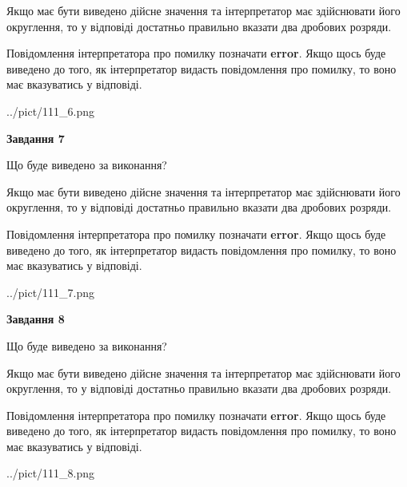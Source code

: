 \documentclass[12pt, ukrainian]{article}
\begin{document}
{\begin {Large}
Якщо має бути виведено дійсне значення та інтерпретатор має здійснювати його округлення, 
то у відповіді достатньо правильно вказати два дробових розряди.

Повідомлення інтерпретатора про помилку позначати \textbf{error}.
Якщо щось буде виведено до того, як інтерпретатор видасть повідомлення про помилку, 
то воно має вказуватись у відповіді. \par

\begin{center}
	{../pict/111_6.png}
\end{center}
\newpage

{\begin {center}\textbf{Завдання 7}\end {center}}\par
Що буде виведено за виконання? \par

Якщо має бути виведено дійсне значення та інтерпретатор має здійснювати його округлення, 
то у відповіді достатньо правильно вказати два дробових розряди.

Повідомлення інтерпретатора про помилку позначати \textbf{error}.
Якщо щось буде виведено до того, як інтерпретатор видасть повідомлення про помилку, 
то воно має вказуватись у відповіді. \par

\begin{center}
	{../pict/111_7.png}
\end{center}
\newpage

{\begin {center}\textbf{Завдання 8}\end {center}}\par
Що буде виведено за виконання? \par

Якщо має бути виведено дійсне значення та інтерпретатор має здійснювати його округлення, 
то у відповіді достатньо правильно вказати два дробових розряди.

Повідомлення інтерпретатора про помилку позначати \textbf{error}.
Якщо щось буде виведено до того, як інтерпретатор видасть повідомлення про помилку, 
то воно має вказуватись у відповіді. \par

\begin{center}
	{../pict/111_8.png}
\end{center}
\newpage


\end{Large}}
\end{document}
